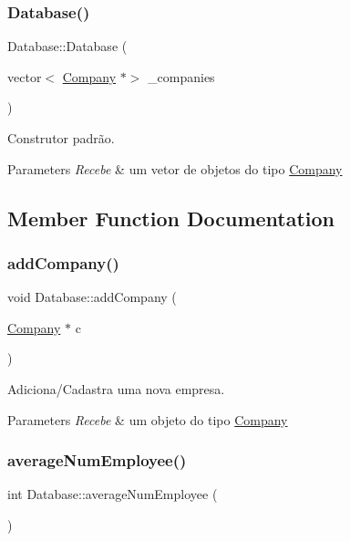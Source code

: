 \subsubsection{\texorpdfstring{Database()}{Database()}}
{\footnotesize\ttfamily Database\+::\+Database (\begin{DoxyParamCaption}\item[{vector$<$ \hyperlink{classCompany}{Company} $\ast$$>$}]{\+\_\+companies }\end{DoxyParamCaption})}



Construtor padrão. 


\begin{DoxyParams}{Parameters}
{\em Recebe} & um vetor de objetos do tipo \hyperlink{classCompany}{Company} \\
\hline
\end{DoxyParams}


\subsection{Member Function Documentation}
\mbox{\label{classDatabase_a6f8b42dde0df14d3d55422ab0da2152c}} 
\subsubsection{\texorpdfstring{add\+Company()}{addCompany()}}
{\footnotesize\ttfamily void Database\+::add\+Company (\begin{DoxyParamCaption}\item[{\hyperlink{classCompany}{Company} $\ast$}]{c }\end{DoxyParamCaption})}



Adiciona/\+Cadastra uma nova empresa. 


\begin{DoxyParams}{Parameters}
{\em Recebe} & um objeto do tipo \hyperlink{classCompany}{Company} \\
\hline
\end{DoxyParams}
\mbox{\label{classDatabase_a89c97fa6d6006fb6ab10981bceb07e56}} 
\subsubsection{\texorpdfstring{average\+Num\+Employee()}{averageNumEmployee()}}
{\footnotesize\ttfamily int Database\+::average\+Num\+Employee (\begin{DoxyParamCaption}{ }\end{DoxyParamCaption})}



